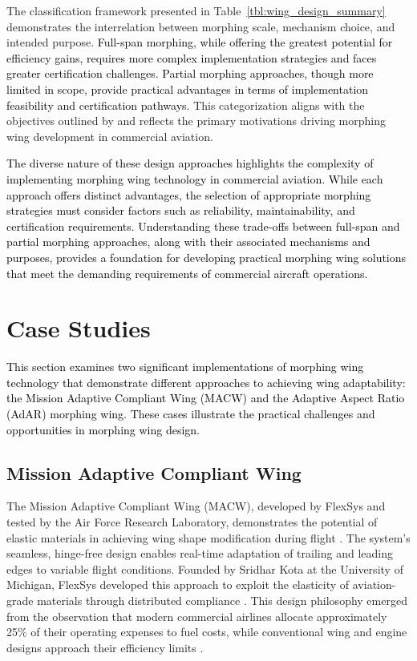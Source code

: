 \documentclass[letterpaper, journal, twoside]{IEEEtran}
\newcommand{\revision}[1]{\textcolor{black}{ #1}}
\begin{document}
The classification framework presented in Table~\ref{tbl:wing_design_summary} demonstrates the interrelation between morphing scale, mechanism choice, and intended purpose. \revision{Full-span morphing, while offering the greatest potential for efficiency gains, requires more complex implementation strategies and faces greater certification challenges. Partial morphing approaches, though more limited in scope, provide practical advantages in terms of implementation feasibility and certification pathways.} This categorization aligns with the objectives outlined by \cite{friswell2006morphing} and reflects the primary motivations driving morphing wing development in commercial aviation.

\revision{The diverse nature of these design approaches highlights the complexity of implementing morphing wing technology in commercial aviation. While each approach offers distinct advantages, the selection of appropriate morphing strategies must consider factors such as reliability, maintainability, and certification requirements. Understanding these trade-offs between full-span and partial morphing approaches, along with their associated mechanisms and purposes, provides a foundation for developing practical morphing wing solutions that meet the demanding requirements of commercial aircraft operations.}

\section{Case Studies}\label{sec:case_studies}

\revision{This section examines two significant implementations of morphing wing technology that demonstrate different approaches to achieving wing adaptability: the Mission Adaptive Compliant Wing (MACW) and the Adaptive Aspect Ratio (AdAR) morphing wing. These cases illustrate the practical challenges and opportunities in morphing wing design.}

\subsection{Mission Adaptive Compliant Wing}
The Mission Adaptive Compliant Wing (MACW), developed by FlexSys and tested by the Air Force Research Laboratory, demonstrates the potential of elastic materials in achieving wing shape modification during flight \cite{flexsys2024flexfoil}. The system's seamless, hinge-free design enables real-time adaptation of trailing and leading edges to variable flight conditions. Founded by Sridhar Kota at the University of Michigan, FlexSys developed this approach to exploit the elasticity of aviation-grade materials through distributed compliance \cite{flexsys2024flexfoil}. This design philosophy emerged from the observation that modern commercial airlines allocate approximately 25\% of their operating expenses to fuel costs, while conventional wing and engine designs approach their efficiency limits \cite{kota2024future}.
\end{document}
